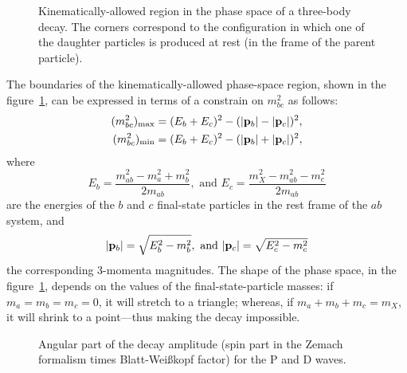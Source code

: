     \begin{figure}
        \centering
        
        \caption{Kinematically-allowed region in the phase space of a three-body decay. The corners correspond to the configuration in which one of the daughter particles is produced at rest (in the frame of the parent particle).}
        \label{fig:dalitz_kinematically_allowed}
    \end{figure}
    The boundaries of the kinematically-allowed phase-space region, shown in the figure~\ref{fig:dalitz_kinematically_allowed}, can be expressed in terms of a constrain on $m_{bc}^2$ as follows:
    \begin{equation}
        \begin{aligned}
            (m_{bc}^2)_{\text{max}} &= (E_b + E_c)^2 - (\lvert\mathbf{{p}}_b\rvert - \lvert\mathbf{{p}}_c\rvert)^2,\\
            (m_{bc}^2)_{\text{min}} &= (E_b + E_c)^2 - (\lvert\mathbf{{p}}_b\rvert + \lvert\mathbf{{p}}_c\rvert)^2,
        \end{aligned}
    \end{equation}
    where
    \begin{equation}
        E_b = \frac{m_{ab}^2 - m_a^2 + m_b^2}{2m_{ab}},\text{ and }
        E_c = \frac{m_X^2 - m_{ab}^2 - m_c^2}{2 m_{ab}}
    \end{equation}
    are the energies of the $b$ and $c$ final-state particles in the rest frame of the $ab$ system, and
    \begin{equation}
        \lvert\mathbf{{p}}_b\rvert = \sqrt{E_b^2 - m_b^2},\text{ and }
        \lvert\mathbf{{p}}_c\rvert = \sqrt{E_c^2 - m_c^2}
    \end{equation}
    the corresponding 3-momenta magnitudes.
    The shape of the phase space, in the figure~\ref{fig:dalitz_kinematically_allowed}, depends on the values of the final-state-particle masses:
    if $m_a = m_b = m_c = 0$, it will stretch to a triangle; whereas, if $m_a + m_b + m_c = m_X$, it will shrink to a point---thus making the decay impossible.

    \begin{figure}
        \centering

        \subfloat[]%
                 [P wave.]%
                 {}

        \subfloat[]%
                 [D wave.]%
                 {}

        \caption{Angular part of the decay amplitude (spin part in the Zemach formalism times Blatt-Wei\ss{}kopf factor) for the P and D waves.}
        \label{fig:dalitz_angular_parts}
    \end{figure}
